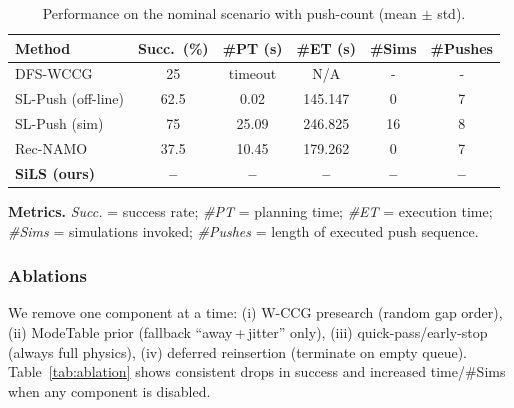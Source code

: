 \begin{table}[t]
  \centering
  \begin{threeparttable}
  \caption{Performance on the nominal scenario with push-count (mean $\pm$ std).}
  \label{tab:main-push}
  \vspace{2pt}
  
  \setlength{\tabcolsep}{2.3pt} %
  
  \begin{tabular}{lccccc}
  \toprule
  Method & Succ.~(\%) & \#PT (s) & \#ET (s) & \#Sims & \#Pushes \\
  \midrule
  DFS-WCCG            & 25 & timeout & N/A & - & - \\
  SL-Push (off-line)  & 62.5 & 0.02 & 145.147 & 0 & 7 \\
  SL-Push (sim)       & 75 & 25.09 & 246.825 & 16 & 8 \\
  Rec-NAMO            & 37.5 & 10.45 & 179.262 & 0 & 7 \\
  \textbf{SiLS (ours)}& \textbf{--} & \textbf{--} & \textbf{--} & \textbf{--} & \textbf{--} \\
  \bottomrule
  \end{tabular}
  
  \begin{tablenotes}[flushleft]\footnotesize
  \item \textbf{Metrics.} \emph{Succ.} = success rate; \emph{\#PT} = planning time; \emph{\#ET} = execution time;
  \emph{\#Sims} = simulations invoked; \emph{\#Pushes} = length of executed push sequence.
  \end{tablenotes}
  \end{threeparttable}
  \end{table}
  


\subsubsection{Ablations}
\label{subsec:ablations}
We remove one component at a time: (i) W-CCG presearch (random gap order),
(ii) ModeTable prior (fallback “away\,+\,jitter” only),
(iii) quick-pass/early-stop (always full physics),
(iv) deferred reinsertion (terminate on empty queue).
Table~\ref{tab:ablation} shows consistent drops in success and increased
time/\#Sims when any component is disabled.

